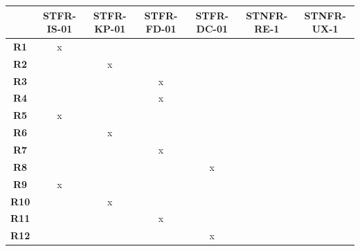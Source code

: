 \documentclass[12pt, titlepage]{article}
\begin{document}
\begin{table}[h!]
  \centering
  \begin{tabular}{|c|c|c|c|c|c|c|}
  \hline
  \textbf{}     & \textbf{STFR-IS-01} & \textbf{STFR-KP-01} & \textbf{STFR-FD-01} & \textbf{STFR-DC-01} & \textbf{STNFR-RE-1} & \textbf{STNFR-UX-1} \\ \hline
  \textbf{R1}   & x                   &                     &                     &                     &                     &                     \\ \hline
  \textbf{R2}   &                     & x                   &                     &                     &                     &                     \\ \hline
  \textbf{R3}   &                     &                     & x                   &                     &                     &                     \\ \hline
  \textbf{R4}   &                     &                     & x                   &                     &                     &                     \\ \hline
  \textbf{R5}   & x                   &                     &                     &                     &                     &                     \\ \hline
  \textbf{R6}   &                     & x                   &                     &                     &                     &                     \\ \hline
  \textbf{R7}   &                     &                     & x                   &                     &                     &                     \\ \hline
  \textbf{R8}   &                     &                     &                     & x                   &                     &                     \\ \hline
  \textbf{R9}   & x                   &                     &                     &                     &                     &                     \\ \hline
  \textbf{R10}  &                     & x                   &                     &                     &                     &                     \\ \hline
  \textbf{R11}  &                     &                     & x                   &                     &                     &                     \\ \hline
  \textbf{R12}  &                     &                     &                     & x                   &                     &                     \\ \hline

\end{tabular}
\end{table}
\end{document}
